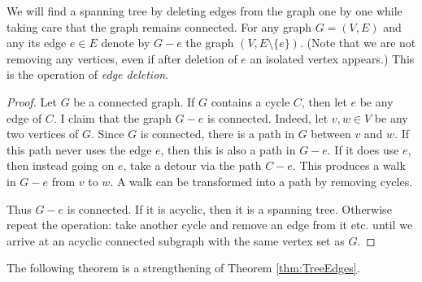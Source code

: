 

\setcounter{section}{2}
\setcounter{subsection}{4}
\setcounter{dfn}{11}

We will find a spanning tree by deleting edges from the graph one by one while taking care that the graph remains connected.
For any graph $G = (V, E)$ and any its edge $e \in E$ denote by $G - e$ the graph $(V, E \setminus \{e\})$.
(Note that we are not removing any vertices, even if after deletion of $e$ an isolated vertex appears.)
This is the operation of \emph{edge deletion}.
\begin{proof}
Let $G$ be a connected graph.
If $G$ contains a cycle $C$, then let $e$ be any edge of $C$.
I claim that the graph $G - e$ is connected.
Indeed, let $v, w \in V$ be any two vertices of $G$.
Since $G$ is connected, there is a path in $G$ between $v$ and $w$.
If this path never uses the edge $e$, then this is also a path in $G - e$.
If it does use $e$, then instead going on $e$, take a detour via the path $C - e$.
This produces a walk in $G - e$ from $v$ to $w$.
A walk can be transformed into a path by removing cycles.

Thus $G - e$ is connected.
If it is acyclic, then it is a spanning tree.
Otherwise repeat the operation: take another cycle and remove an edge from it etc.
until we arrive at an acyclic connected subgraph with the same vertex set as $G$.
\end{proof}

The following theorem is a strengthening of Theorem \ref{thm:TreeEdges}.


